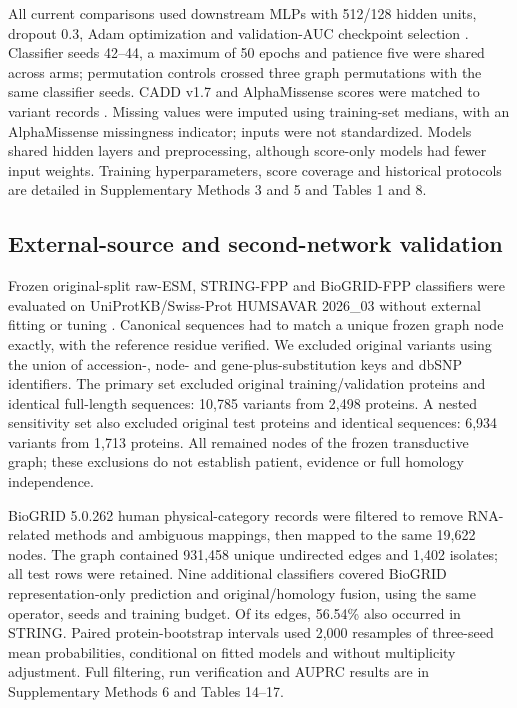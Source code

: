 \documentclass[conference]{IEEEtran}
\begin{document}
All current comparisons used downstream MLPs with 512/128 hidden units, dropout 0.3, Adam optimization and validation-AUC checkpoint selection \cite{Kingma2015Adam}. Classifier seeds 42--44, a maximum of 50 epochs and patience five were shared across arms; permutation controls crossed three graph permutations with the same classifier seeds. CADD v1.7 and AlphaMissense scores were matched to variant records \cite{Schubach2024CADDv17,Cheng2023AlphaMissense}. Missing values were imputed using training-set medians, with an AlphaMissense missingness indicator; inputs were not standardized. Models shared hidden layers and preprocessing, although score-only models had fewer input weights. Training hyperparameters, score coverage and historical protocols are detailed in Supplementary Methods 3 and 5 and Tables 1 and 8.

\subsection{External-source and second-network validation}

Frozen original-split raw-ESM, STRING-FPP and BioGRID-FPP classifiers were evaluated on UniProtKB/Swiss-Prot HUMSAVAR 2026\_03 without external fitting or tuning \cite{UniProt2025}. Canonical sequences had to match a unique frozen graph node exactly, with the reference residue verified. We excluded original variants using the union of accession-, node- and gene-plus-substitution keys and dbSNP identifiers. The primary set excluded original training/validation proteins and identical full-length sequences: 10,785 variants from 2,498 proteins. A nested sensitivity set also excluded original test proteins and identical sequences: 6,934 variants from 1,713 proteins. All remained nodes of the frozen transductive graph; these exclusions do not establish patient, evidence or full homology independence.

BioGRID 5.0.262 human physical-category records \cite{Stark2006BioGRID} were filtered to remove RNA-related methods and ambiguous mappings, then mapped to the same 19,622 nodes. The graph contained 931,458 unique undirected edges and 1,402 isolates; all test rows were retained. Nine additional classifiers covered BioGRID representation-only prediction and original/homology fusion, using the same operator, seeds and training budget. Of its edges, 56.54\% also occurred in STRING. Paired protein-bootstrap intervals used 2,000 resamples of three-seed mean probabilities, conditional on fitted models and without multiplicity adjustment. Full filtering, run verification and AUPRC results are in Supplementary Methods 6 and Tables 14--17.
\end{document}
